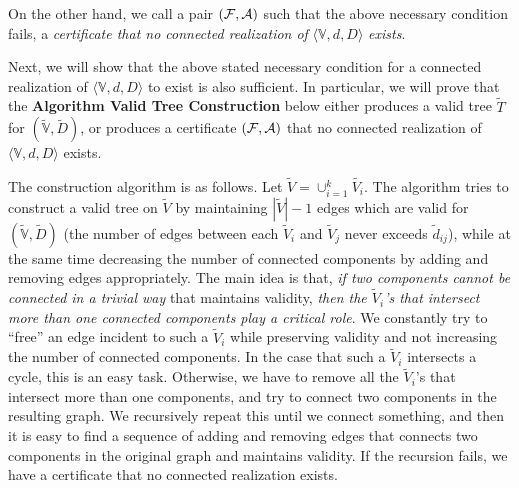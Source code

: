\documentclass[12pt,a4paper]{article}
\theoremstyle{definition}
\theoremstyle{plain}
\begin{document}
On the other hand, we call a pair $({\cal F}, {\cal A})$  such that
the above necessary condition fails,
a {\it certificate that no connected realization of }
$\langle{\mathbb V},d,D\rangle$ {\it exists}.

Next, we will show that the above stated necessary condition
for a connected realization of $\langle{\mathbb V},d,D\rangle$ to exist
is also sufficient.
In particular, we will prove that the  
{\bf Algorithm Valid Tree Construction} below
either produces a valid tree $\widetilde{T}$ for
$(\widetilde{\mathbb V}, \widetilde{D} )$,
or produces a certificate $({\cal F}, {\cal A})$
that no connected realization of $\langle{\mathbb V},d,D\rangle$ exists.


The construction algorithm is as follows.
Let $\widetilde{V} \! = \! \cup_{{i=1}}^k \widetilde{V_i}$.
The algorithm tries to construct a valid tree on $\widetilde{V}$
by maintaining $|\widetilde{V}| \! - \! 1$ edges which
are valid for $(\widetilde{\mathbb V} , \widetilde{D})$
(the number of edges between each $\widetilde{V}_{i}$
and $\widetilde{V}_{j}$ never exceeds $\widetilde{d}_{{ij}}$),
while at the same time decreasing the number of connected components
by adding and removing edges appropriately.
The main idea is that, {\it if two components cannot be connected
in a trivial way} that maintains validity,
{\it then the $\widetilde{V}_{i}$'s that intersect more than one connected
components play a critical role}.
We constantly try to ``free'' an edge incident to such a
$\widetilde{V}_{i}$ while preserving validity and not increasing the
number of connected components.
In the case that such a $\widetilde{V}_{i}$ intersects a cycle,
this is an easy task. Otherwise, we have to remove all the
$\widetilde{V}_{i}$'s that intersect more than one components,
and try to connect two components in the resulting graph.
We recursively repeat this until we connect something,
and then it is easy to find a sequence of adding and removing edges
that connects two components in the original graph and maintains validity.
If the recursion fails, we 
have a certificate
that no connected realization exists.\medskip
\end{document}
